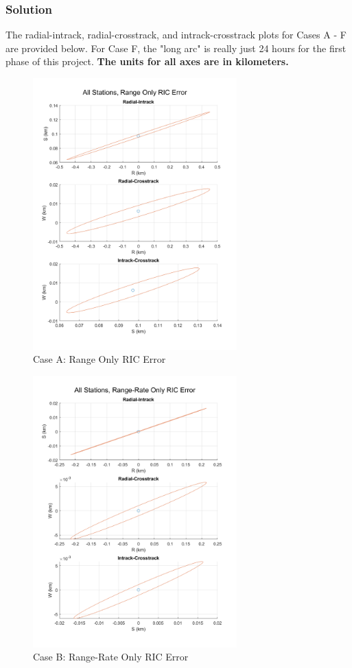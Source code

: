 \documentclass[conf]{new-aiaa}
\begin{document}
\subsubsection*{Solution} 

The radial-intrack, radial-crosstrack, and intrack-crosstrack plots for Cases A - F are provided below. For Case F, the "long arc" is really just 24 hours for the first phase of this project. \textbf{The units for all axes are in kilometers.}


\begin{figure}[H]
	\centering
	\includegraphics[width=0.7\textwidth]{caseA_RICerr.png}
	\caption{Case A: Range Only RIC Error}
\end{figure}

\begin{figure}[H]
	\centering
	\includegraphics[width=0.7\textwidth]{caseB_RICerr.png}
	\caption{Case B: Range-Rate Only RIC Error}
\end{figure}
\end{document}
